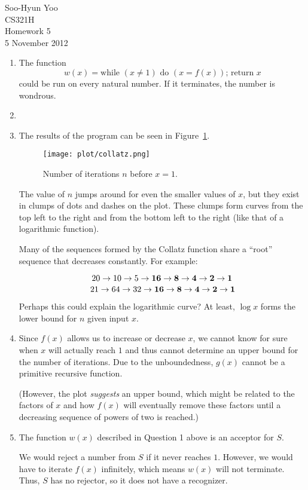 \documentclass[12pt,letterpaper]{article}
\begin{document}
Soo-Hyun Yoo \\
CS321H \\
Homework 5 \\
5 November 2012

\begin{enumerate}
	\item The function \[w(x) = \text{while } (x \neq 1) \text{ do } (x = f(x)) \text{; return } x\] could be run on every natural number. If it terminates, the number is wondrous.

	\item 

	\newpage
	\item The results of the program can be seen in Figure~\ref{fig:plot}.

		\begin{figure}[!h]
			\centering
			\texttt{[image: plot/collatz.png]}
			\caption{Number of iterations $n$ before $x=1$.}
			\label{fig:plot}
		\end{figure}

		The value of $n$ jumps around for even the smaller values of $x$, but they exist in clumps of dots and dashes on the plot. These clumps form curves from the top left to the right and from the bottom left to the right (like that of a logarithmic function).

		Many of the sequences formed by the Collatz function share a ``root'' sequence that decreases constantly. For example:

		\[20 \rightarrow 10 \rightarrow 5 \rightarrow {\bf 16 \rightarrow 8 \rightarrow 4 \rightarrow 2 \rightarrow 1}\]
		\[21 \rightarrow 64 \rightarrow 32 \rightarrow {\bf 16 \rightarrow 8 \rightarrow 4 \rightarrow 2 \rightarrow 1}\]

		Perhaps this could explain the logarithmic curve? At least, $\log x$ forms the lower bound for $n$ given input $x$.


	\item Since $f(x)$ allows us to increase or decrease $x$, we cannot know for sure when $x$ will actually reach $1$ and thus cannot determine an upper bound for the number of iterations. Due to the unboundedness, $g(x)$ cannot be a primitive recursive function.

		(However, the plot {\it suggests} an upper bound, which might be related to the factors of $x$ and how $f(x)$ will eventually remove these factors until a decreasing sequence of powers of two is reached.)


	\item The function $w(x)$ described in Question 1 above is an acceptor for $S$.

		We would reject a number from $S$ if it never reaches $1$. However, we would have to iterate $f(x)$ infinitely, which means $w(x)$ will not terminate. Thus, $S$ has no rejector, so it does not have a recognizer.
\end{enumerate}
\end{document}
